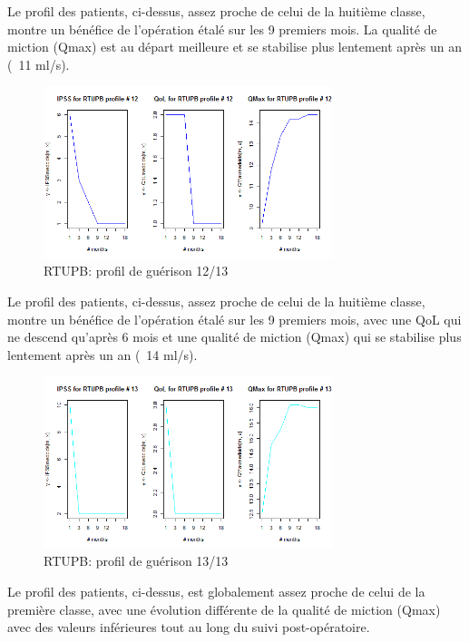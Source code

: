 Le profil des patients, ci-dessus, assez proche de celui de la huitième classe, montre un bénéfice de l'opération étalé sur les 9 premiers mois. La qualité de miction (Qmax) est au départ meilleure et se stabilise plus lentement après un an (~11 ml/s).

\begin{figure}[H]
\centering
\includegraphics[width=0.75\textwidth]{../Fig/RTUPB/rtupb-profil-post-12.png}
\caption{RTUPB: profil de guérison 12/13}
\end{figure}

Le profil des patients, ci-dessus, assez proche de celui de la huitième classe, montre un bénéfice de l'opération étalé sur les 9 premiers mois, avec une QoL qui ne descend qu'après 6 mois et une qualité de miction (Qmax) qui se stabilise plus lentement après un an (~14 ml/s).

\begin{figure}[H]
\centering
\includegraphics[width=0.75\textwidth]{../Fig/RTUPB/rtupb-profil-post-13.png}
\caption{RTUPB: profil de guérison 13/13}
\end{figure}

Le profil des patients, ci-dessus, est globalement assez proche de celui de la première classe, avec une évolution différente de la qualité de miction (Qmax) avec des valeurs inférieures tout au long du suivi post-opératoire.

